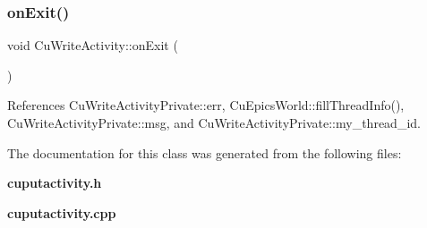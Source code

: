 \subsubsection{on\+Exit()}
{\footnotesize\ttfamily void Cu\+Write\+Activity\+::on\+Exit (\begin{DoxyParamCaption}{ }\end{DoxyParamCaption})\hspace{0.3cm}{\ttfamily [protected]}}



References Cu\+Write\+Activity\+Private\+::err, Cu\+Epics\+World\+::fill\+Thread\+Info(), Cu\+Write\+Activity\+Private\+::msg, and Cu\+Write\+Activity\+Private\+::my\+\_\+thread\+\_\+id.



The documentation for this class was generated from the following files\+:\begin{DoxyCompactItemize}
\item 
\textbf{ cuputactivity.\+h}\item 
\textbf{ cuputactivity.\+cpp}\end{DoxyCompactItemize}
